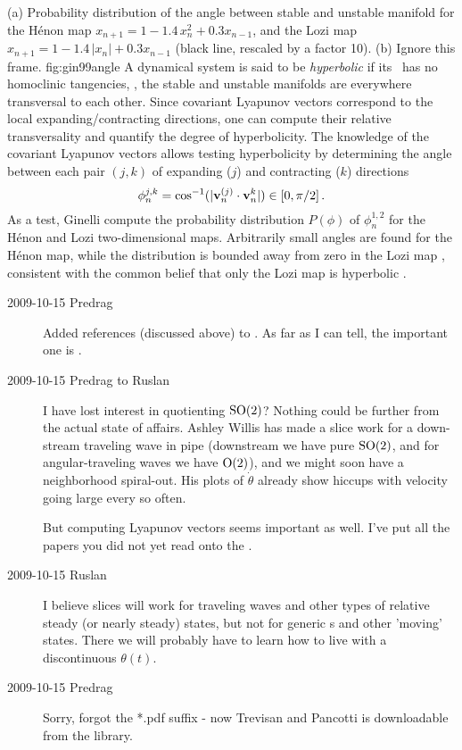 %
{}{
(a) Probability distribution of the angle between stable and
unstable manifold for the H\'enon map $x_{n+1} = 1 -1.4\,
x_n^2 + 0.3 x_{n-1}$, and the Lozi map $x_{n+1} = 1
-1.4\,|x_n| + 0.3 x_{n-1}$ (black line, rescaled by a factor
10). (b) Ignore this frame.
}{fig:gin99angle} %
%
%
A dynamical system is said to be \emph{hyperbolic} if its
\statesp\ has no homoclinic tangencies, \ie, the stable and
unstable manifolds are everywhere transversal to each other.
Since covariant Lyapunov vectors correspond to the local
expanding/contracting directions, one can compute their
relative transversality and quantify the degree of hyperbolicity.
The knowledge of the covariant Lyapunov vectors allows testing hyperbolicity by
determining the angle between each pair $(j,k)$ of expanding
($j$) and contracting ($k$) directions
\[
\phi_n^{j,k} = \cos^{-1}(|{\bf v}_n^{(j)} \cdot{\bf v}_n^k|) \in [0,\pi/2]
\,.
\]
As a test, Ginelli \etal{} compute the
probability distribution $P(\phi)$ of $\phi_n^{1,2}$ for the
H\'enon and Lozi two-dimensional maps. Arbitrarily small
angles are found for the H\'enon map, while the distribution
is bounded away from zero in the Lozi map ,
consistent with the common belief that
only the Lozi map is hyperbolic .

\begin{description}
\item[2009-10-15 Predrag]
Added references 
(discussed above) to
. As far as I can tell, the important one is
.

\item[2009-10-15 Predrag to Ruslan]
I have lost interest in quotienting $\textrm{SO}(2)$? Nothing could
be further from the actual state of affairs. Ashley Willis
has made a slice work for a down-stream traveling wave in
pipe (downstream we have pure $\textrm{SO}(2)$, and for
angular-traveling waves we have $\textrm{O}(2)$), and we might soon have a
neighborhood spiral-out. His plots of $\dot{\theta}$ already
show hiccups with velocity going large every so often.

But computing Lyapunov vectors seems important as well. I've
put all the papers you did not yet read onto the
.

\item[2009-10-15 Ruslan]
I believe slices will work for traveling waves and other
types of relative steady (or nearly steady) states, but not
for generic \rpo s and other 'moving' states.  There we will
probably have to learn how to live with a discontinuous
$\theta(t)$.


\item[2009-10-15 Predrag]
Sorry, forgot the *.pdf suffix - now Trevisan and Pancotti is
downloadable from the library.

\end{description}




\renewcommand{\ssp}{a}
